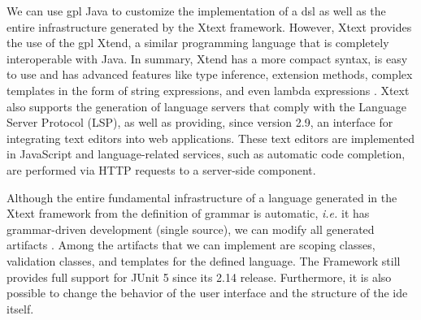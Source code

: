 We can use \ac{gpl} Java to customize the implementation of a \ac{dsl} as well as the entire infrastructure generated by the Xtext framework.
However, Xtext provides the use of the \ac{gpl} Xtend, a similar programming language that is completely interoperable with Java. 
In summary, Xtend has a more compact syntax, is easy to use and has advanced features like type inference, extension methods, complex templates in the form of string expressions, and even lambda expressions \cite{Bettini:2016}.
Xtext also supports the generation of language servers that comply with the Language Server Protocol (LSP), as well as providing, since version 2.9, an interface for integrating text editors into web applications.
These text editors are implemented in JavaScript and language-related services, such as automatic code completion, are performed via HTTP requests to a server-side component.

Although the entire fundamental infrastructure of a language generated in the Xtext framework from the definition of grammar is automatic, \textit{i.e.} it has grammar-driven development (single source), we can modify all generated artifacts \cite{XtextSirius:2017}.
Among the artifacts that we can implement are scoping classes, validation classes, and templates for the defined language.
The Framework still provides full support for JUnit 5 since its 2.14 release.
Furthermore, it is also possible to change the behavior of the user interface and the structure of the \ac{ide} itself.


